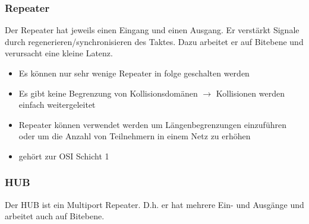 \documentclass[12pt,a4paper]{article}
\begin{document}
		\subsubsection{Repeater}
			Der Repeater hat jeweils einen Eingang und einen Ausgang. Er verstärkt Signale durch regenerieren/synchronisieren des Taktes. Dazu arbeitet er auf Bitebene und verursacht eine kleine Latenz.
			\begin{center}
			\end{center}
			\begin{itemize}
				\item Es können nur sehr wenige Repeater in folge geschalten werden
				\item Es gibt keine Begrenzung von Kollisionsdomänen $\rightarrow$ Kollisionen werden einfach weitergeleitet
				\item Repeater können verwendet werden um Längenbegrenzungen einzuführen oder um die Anzahl von Teilnehmern in einem Netz zu erhöhen
				\item gehört zur OSI Schicht 1
			\end{itemize}
		
		\subsubsection{HUB}
		Der HUB ist ein Multiport Repeater. D.h. er hat mehrere Ein- und Ausgänge und arbeitet auch auf Bitebene.
			\begin{center}
			\end{center}
		
\end{document}
